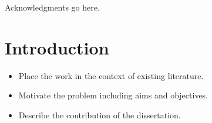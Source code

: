 
\uomtoc


\begin{abstract} %

A brief paragraph describing the contribution of the dissertation.

\end{abstract}%
\clearpage



\begin{uomoriginality}
  \uomoriginalitydeclaration 
\end{uomoriginality}
\uomcopyrightstatement


\begin{uomacknowledgements}
Acknowledgments go here.
\end{uomacknowledgements}


\uomstartmainbody %


\section{Introduction} %
  
\begin{itemize}
\item Place the work in the context of existing literature.
\item Motivate the problem including aims and objectives.
\item Describe the contribution of the dissertation.
\end{itemize}

